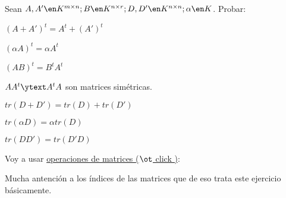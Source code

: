 \begin{enunciado}{\ejercicio}
  Sean $A, A' \en K^{m \times n}; B \en K^{n \times r}; D, D' \en K^{n \times n}; \alpha \en K$. Probar:
  \begin{enumerate}[label=(\alph*)]
    \begin{multicols}{2}
      \item $(A + A')^t = A^t + (A')^t$
      \item $(\alpha A)^t = \alpha A^t$
      \item $(AB)^t = B^tA^t$
      \item $AA^t \ytext A^tA$ son matrices simétricas.
      \item $tr(D + D') = tr(D) + tr(D')$
      \item $tr(\alpha D) = \alpha tr(D)$
      \item $tr(D D') = tr(D'D)$
    \end{multicols}
  \end{enumerate}
\end{enunciado}

Voy a usar \hyperlink{teoria-1:operaciones-matrices}{operaciones de matrices {\tiny($\ot$ click {\tiny{}})}}:

\red{\atencion}Mucha antención a los índices de las matrices que de eso trata este ejercicio básicamente.

